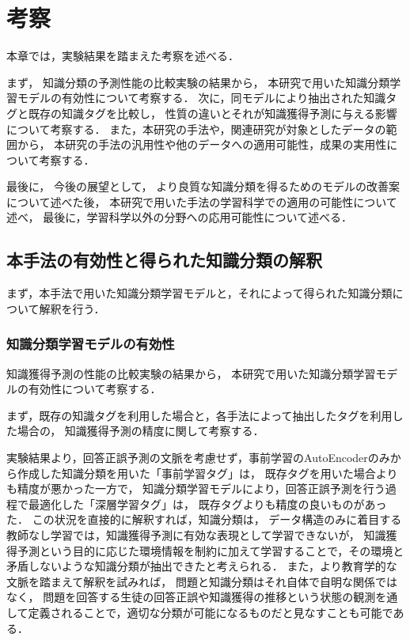 \chapter{考察}
\label{chap:discussion}
\fancyhf{}
\rhead{\thepage}
\cfoot{\thepage}

本章では，実験結果を踏まえた考察を述べる．

まず，
知識分類の予測性能の比較実験の結果から，
本研究で用いた知識分類学習モデルの有効性について考察する．
次に，同モデルにより抽出された知識タグと既存の知識タグを比較し，
性質の違いとそれが知識獲得予測に与える影響について考察する．
また，本研究の手法や，関連研究が対象としたデータの範囲から，
本研究の手法の汎用性や他のデータへの適用可能性，成果の実用性について考察する．

最後に，
今後の展望として，
より良質な知識分類を得るためのモデルの改善案について述べた後，
本研究で用いた手法の学習科学での適用の可能性について述べ，
最後に，学習科学以外の分野への応用可能性について述べる．

\section{本手法の有効性と得られた知識分類の解釈}
まず，本手法で用いた知識分類学習モデルと，それによって得られた知識分類について解釈を行う．


\subsection{知識分類学習モデルの有効性}
知識獲得予測の性能の比較実験の結果から，
本研究で用いた知識分類学習モデルの有効性について考察する．


まず，既存の知識タグを利用した場合と，各手法によって抽出したタグを利用した場合の，
知識獲得予測の精度に関して考察する．

実験結果より，回答正誤予測の文脈を考慮せず，事前学習のAutoEncoderのみから作成した知識分類を用いた「事前学習タグ」は，
既存タグを用いた場合よりも精度が悪かった一方で，
知識分類学習モデルにより，回答正誤予測を行う過程で最適化した「深層学習タグ」は，
既存タグよりも精度の良いものがあった．
この状況を直接的に解釈すれば，知識分類は，
データ構造のみに着目する教師なし学習では，知識獲得予測に有効な表現として学習できないが，
知識獲得予測という目的に応じた環境情報を制約に加えて学習することで，その環境と矛盾しないような知識分類が抽出できたと考えられる．
また，より教育学的な文脈を踏まえて解釈を試みれば，
問題と知識分類はそれ自体で自明な関係ではなく，
問題を回答する生徒の回答正誤や知識獲得の推移という状態の観測を通して定義されることで，適切な分類が可能になるものだと見なすことも可能である．

